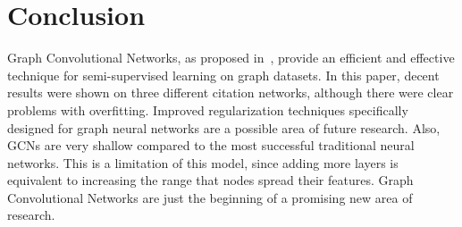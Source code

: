 \section{Conclusion}

Graph Convolutional Networks, as proposed in~\cite{Kipf2016}, provide an efficient and effective technique for semi-supervised learning on graph datasets. In this paper, decent results were shown on three different citation networks, although there were clear problems with overfitting. Improved regularization techniques specifically designed for graph neural networks are a possible area of future research. Also, GCNs are very shallow compared to the most successful traditional neural networks. This is a limitation of this model, since adding more layers is equivalent to increasing the range that nodes spread their features. Graph Convolutional Networks are just the beginning of a promising new area of research. 